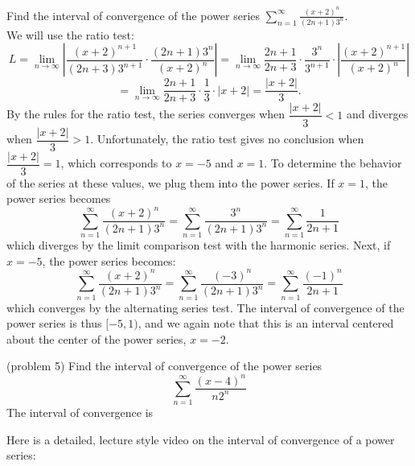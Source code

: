 \documentclass[handout]{ximera}
\begin{document}
\begin{example}[example 5]
Find the interval of convergence of the power series $\displaystyle{\sum_{n=1}^\infty \frac{(x+2)^n}{(2n+1)3^n}}$.\\
We will use the ratio test:
\[
L = \lim_{n \to \infty} \left|\frac{(x+2)^{n+1}}{(2n+3)3^{n+1}} \cdot \frac{(2n+1) 3^n}{(x+2)^n} \right| = 
\lim_{n \to \infty} \frac{2n+1}{2n+3} \cdot \frac{3^n}{3^{n+1}} \cdot \left|  \frac{(x+2)^{n+1}}{(x+2)^n} \right| 
\]
\[
= \lim_{n \to \infty} \frac{2n+1}{2n+3} \cdot \frac13 \cdot \left|  x+2 \right| = \frac{|x+2|}{3}.
\]
By the rules for the ratio test, the series converges when $\dfrac{|x+2|}{3} < 1$ and diverges when $\dfrac{|x+2|}{3} > 1$.
Unfortunately, the ratio test gives no conclusion when $\dfrac{|x+2|}{3} = 1$, which corresponds to $x = -5$ and $x = 1$.
To determine the behavior of the series at these values, we plug them into the power series.
If $x = 1$, the power series becomes
\[
\sum_{n=1}^\infty \frac{(x+2)^n}{(2n+1)3^n} = \sum_{n=1}^\infty \frac{3^n}{(2n+1)3^n} = \sum_{n=1}^\infty \frac{1}{2n+1}
\]
which diverges by the limit comparison test with the harmonic series.
Next, if $x = -5$, the power series becomes:
\[
\sum_{n=1}^\infty \frac{(x+2)^n}{(2n+1)3^n} = \sum_{n=1}^\infty \frac{(-3)^n}{(2n+1)3^n} = \sum_{n=1}^\infty \frac{(-1)^n}{2n+1}
\]
which converges by the alternating series test.
The interval of convergence of the power series is thus $[-5, 1)$, and we again note that this is an interval centered about the 
center of the power series, $x = -2$.
\end{example}




\begin{problem}(problem 5)
Find the interval of convergence of the power series
\[
\sum_{n=1}^\infty \frac{(x-4)^n}{n2^n}
\]
The interval of convergence is
\begin{multipleChoice}
\choice[correct]{$[2, 6)$}
\choice{$(2, 6]$}
\choice{$[2, 6]$}
\end{multipleChoice}
\end{problem}



\begin{center}
\begin{foldable}
\end{foldable}
\end{center}

\begin{center}
\begin{foldable}
Here is a detailed, lecture style video on the interval of convergence of a power series:
\end{foldable}
\end{center}
\end{document}
